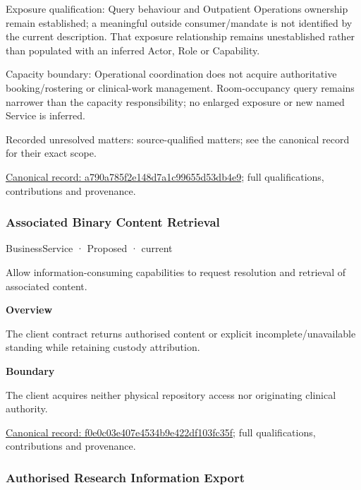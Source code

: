 Exposure qualification: Query behaviour and Outpatient Operations ownership remain established; a meaningful outside consumer/mandate is not identified by the current description. That exposure relationship remains unestablished rather than populated with an inferred Actor, Role or Capability.



Capacity boundary: Operational coordination does not acquire authoritative booking/rostering or clinical-work management. Room-occupancy query remains narrower than the capacity responsibility; no enlarged exposure or new named Service is inferred.


{\small Recorded unresolved matters: source-qualified matters; see the canonical record for their exact scope.}\par
{\footnotesize \href{../../../../continuum/business/business-service/a790a785f2e148d7a1c99655d53db4e9.md}{Canonical record: a790a785f2e148d7a1c99655d53db4e9}; full qualifications, contributions and provenance.}\par
\subsubsection{Associated Binary Content Retrieval}

\label{element:f0e0c03e407e4534b9e422df103fc35f}
{\small BusinessService · Proposed · current}\par

Allow information-consuming capabilities to request resolution and retrieval of associated content.



\textbf{Overview}



The client contract returns authorised content or explicit incomplete/unavailable standing while retaining custody attribution.



\textbf{Boundary}



The client acquires neither physical repository access nor originating clinical authority.


{\footnotesize \href{../../../../continuum/business/business-service/f0e0c03e407e4534b9e422df103fc35f.md}{Canonical record: f0e0c03e407e4534b9e422df103fc35f}; full qualifications, contributions and provenance.}\par
\subsubsection{Authorised Research Information Export}

